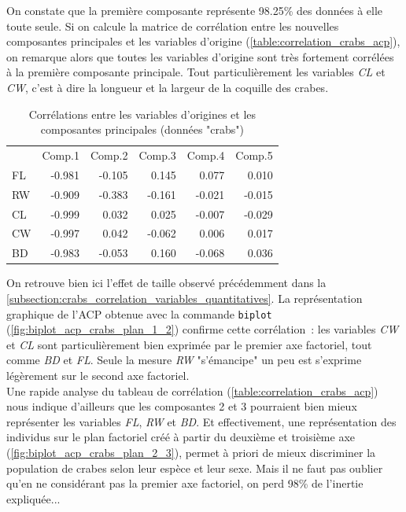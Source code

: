 \documentclass[a4paper,11pt]{report}
\begin{document}
On constate que la première composante représente 98.25\% des données à elle toute seule. Si on calcule la matrice de corrélation entre les nouvelles composantes principales et les variables d'origine (\autoref{table:correlation_crabs_acp}), on remarque alors que toutes les variables d'origine sont très fortement corrélées à la première composante principale.
Tout particulièrement les variables \textit{CL} et \textit{CW}, c'est à dire la longueur et la largeur de la coquille des crabes.

\begin{table}[H]
	\centering
	\captionsetup{justification=centering, margin=2cm}
	\caption{Corrélations entre les variables d'origines et les composantes principales (données "crabs")}
	\label{table:correlation_crabs_acp}
	\begin{tabular}{lrrrrr}
		& Comp.1 & Comp.2 & Comp.3 & Comp.4 & Comp.5 \\ 
		FL & -0.981 & -0.105 & 0.145 & 0.077 & 0.010 \\ 
		RW & -0.909 & -0.383 & -0.161 & -0.021 & -0.015 \\ 
		CL & -0.999 & 0.032 & 0.025 & -0.007 & -0.029 \\ 
		CW & -0.997 & 0.042 & -0.062 & 0.006 & 0.017 \\ 
		BD & -0.983 & -0.053 & 0.160 & -0.068 & 0.036 \\ 
	\end{tabular}
\end{table}

On retrouve bien ici l'effet de taille observé précédemment dans la  \autoref{subsection:crabs_correlation_variables_quantitatives}. La représentation graphique de l'ACP obtenue avec la commande \texttt{biplot} (\autoref{fig:biplot_acp_crabs_plan_1_2}) confirme cette corrélation~: les variables \textit{CW} et \textit{CL} sont particulièrement bien exprimée par le premier axe factoriel, tout comme \textit{BD} et \textit{FL}. Seule la mesure \textit{RW} "s'émancipe" un peu est s'exprime légèrement sur le second axe factoriel.\\
Une rapide analyse du tableau de corrélation (\autoref{table:correlation_crabs_acp}) nous indique d'ailleurs que les composantes 2 et 3 pourraient bien mieux représenter les variables \textit{FL}, \textit{RW} et \textit{BD}. Et effectivement, une représentation des individus sur le plan factoriel créé à partir du deuxième et troisième axe (\autoref{fig:biplot_acp_crabs_plan_2_3}), permet à priori de mieux discriminer la population de crabes selon leur espèce et leur sexe. Mais il ne faut pas oublier qu'en ne considérant pas la premier axe factoriel, on perd 98\% de l'inertie expliquée...
\end{document}
